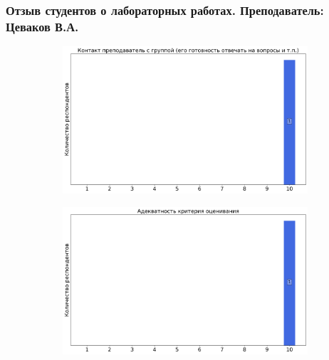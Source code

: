 	\subsubsection{Отзыв студентов о лабораторных работах. Преподаватель: Цеваков В.А.}
		\begin{figure}[H]
			\centering
			\begin{subfigure}[b]{0.45\textwidth}
				\centering
				\includegraphics[width=\textwidth]{images/2 course/Общая физика - электричество и магнетизм/labniks-marks-Цеваков В.А.-0.png}
			\end{subfigure}
			\begin{subfigure}[b]{0.45\textwidth}
				\centering
				\includegraphics[width=\textwidth]{images/2 course/Общая физика - электричество и магнетизм/labniks-marks-Цеваков В.А.-1.png}
			\end{subfigure}
			\begin{subfigure}[b]{0.45\textwidth}
				\centering

\end{subfigure}
\end{figure}

